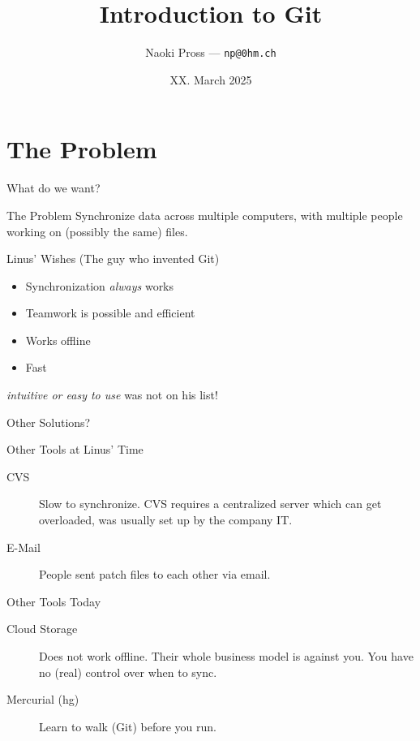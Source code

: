\documentclass[xetex, handout]{beamer}
\title{Introduction to Git}
\author{
  Naoki Pross --- \texttt{np@0hm.ch}
}
\institute{}
\date{XX. March 2025}
\begin{document}
\frame{\titlepage}

\section{The Problem}

\begin{frame}{What do we want?}
  \begin{alertblock}{The Problem}
    Synchronize data across multiple computers, with multiple people working on
    (possibly the same) files.
  \end{alertblock}
  \pause

  \begin{block}{Linus' Wishes (The guy who invented Git)}
    \begin{itemize}
      \item Synchronization \emph{always} works
      \item Teamwork is possible and efficient
      \item Works offline
      \item Fast
    \end{itemize}
    \emph{intuitive or easy to use} was not on his list!
  \end{block}
\end{frame}

\begin{frame}{Other Solutions?}
  \begin{block}{Other Tools at Linus' Time}
    \begin{description}
      \item[CVS] Slow to synchronize. CVS requires a centralized server which
        can get overloaded, was usually set up by the company IT.
      \item[E-Mail] People sent patch files to each other via email.
    \end{description}
  \end{block}
  \begin{block}{Other Tools Today}
    \begin{description}
      \item[Cloud Storage] Does not work offline. Their whole business model is
        against you. You have no (real) control over when to sync.

      \item[Mercurial (hg)] Learn to walk (Git) before you run.
    \end{description}
  \end{block}
\end{frame}
\end{document}
